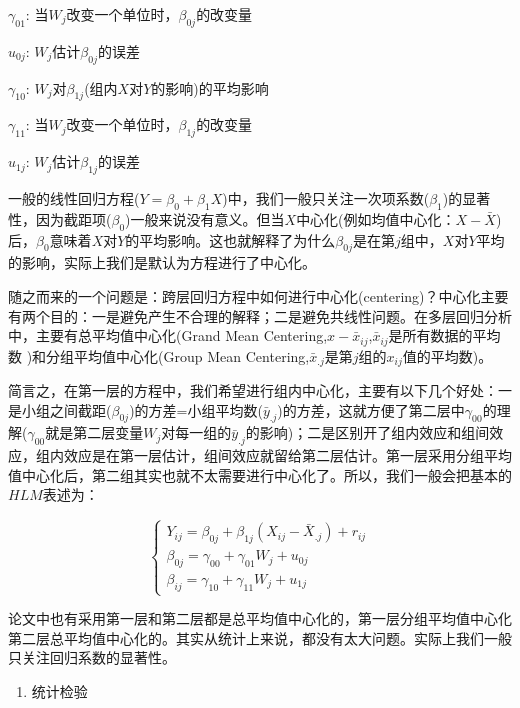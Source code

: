 \documentclass[
]{book}
\providecommand{\tightlist}{%
  \setlength{\itemsep}{0pt}\setlength{\parskip}{0pt}}
\begin{document}
\(\gamma_{01}\): 当\(W_j\)改变一个单位时，\(\beta_{0j}\)的改变量

\(u_{0j}\): \(W_j\)估计\(\beta_{0j}\)的误差

\(\gamma_{10}\): \(W_j\)对\(\beta_{1j}\)(组内\(X\)对\(Y\)的影响)的平均影响

\(\gamma_{11}\): 当\(W_j\)改变一个单位时，\(\beta_{1j}\)的改变量

\(u_{1j}\): \(W_j\)估计\(\beta_{1j}\)的误差

一般的线性回归方程(\(Y=\beta_0+\beta_1X\))中，我们一般只关注一次项系数(\(\beta_1\))的显著性，因为截距项(\(\beta_0\))一般来说没有意义。但当\(X\)中心化(例如均值中心化：\(X-\bar{X}\))后，\(\beta_0\)意味着\(X\)对\(Y\)的平均影响。这也就解释了为什么\(\beta_{0j}\)是在第\(j\)组中，\(X\)对\(Y\)平均的影响，实际上我们是默认为方程进行了中心化。

随之而来的一个问题是：跨层回归方程中如何进行中心化(centering)？中心化主要有两个目的：一是避免产生不合理的解释；二是避免共线性问题。在多层回归分析中，主要有总平均值中心化(Grand Mean Centering,\(x-\bar{x}_{ij}\),\(\bar{x}_{ij}\)是所有数据的平均数 )和分组平均值中心化(Group Mean Centering,\(\bar{x}_{.j}\)是第\(j\)组的\(x_{ij}\)值的平均数)。

简言之，在第一层的方程中，我们希望进行组内中心化，主要有以下几个好处：一是小组之间截距(\(\beta_{0j}\))的方差=小组平均数(\(\bar{y}_{.j}\))的方差，这就方便了第二层中\(\gamma_{00}\)的理解(\(\gamma_{00}\)就是第二层变量\(W_j\)对每一组的\(\bar{y}_{.j}\)的影响)；二是区别开了组内效应和组间效应，组内效应是在第一层估计，组间效应就留给第二层估计。第一层采用分组平均值中心化后，第二组其实也就不太需要进行中心化了。所以，我们一般会把基本的\(HLM\)表述为：

\[
\left\{ \begin{aligned} 
        Y_{ij} = \beta_{0j} + \beta_{1j}(X_{ij} - \bar{X}_{.j}) + r_{ij} \\
        \beta_{0j} = \gamma_{00} + \gamma_{01}W_j + u_{0j} \\
         \beta_{ij} = \gamma_{10} + \gamma_{11}W_j + u_{1j}   
\end{aligned} \right.
\]

论文中也有采用第一层和第二层都是总平均值中心化的，第一层分组平均值中心化第二层总平均值中心化的。其实从统计上来说，都没有太大问题。实际上我们一般只关注回归系数的显著性。

\begin{enumerate}
\def\labelenumi{\arabic{enumi}.}
\setcounter{enumi}{1}
\tightlist
\item
  统计检验
\end{enumerate}
\end{document}
